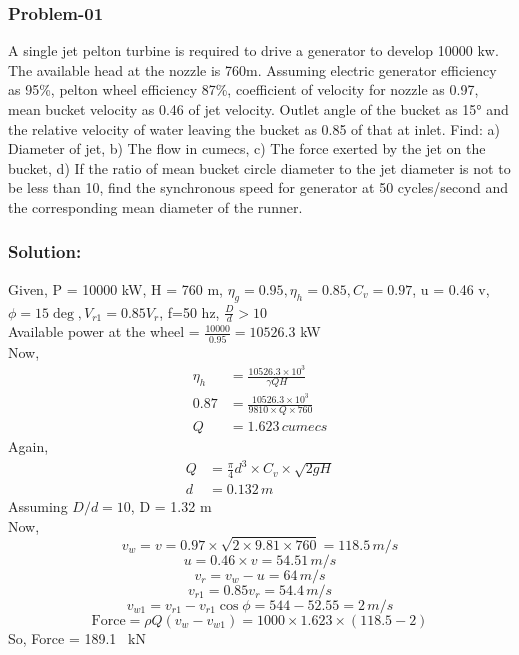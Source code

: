 \documentclass{article}
\begin{document}
\begin{multicols*}{2}
  \subsubsection*{Problem-01}
  A single jet pelton turbine is required to drive a generator to develop 10000 kw. The available head at the nozzle is 760m. Assuming electric generator efficiency as 95\%, pelton wheel efficiency 87\%, coefficient of velocity for nozzle as 0.97, mean bucket velocity as 0.46 of jet velocity. Outlet angle of the bucket as 15° and the relative velocity of water leaving the bucket as 0.85 of that at inlet. Find: a) Diameter of jet, b) The flow in cumecs, c) The force exerted by the jet on the bucket, d) If the ratio of mean bucket circle diameter to the jet diameter is not to be less than 10, find the synchronous speed for generator at 50 cycles/second and the corresponding mean diameter of the runner.

  \subsubsection*{Solution:}
  Given, P = 10000 kW, H = 760 m, $\eta_g = 0.95, \eta_h = 0.85, C_v = 0.97$, u = 0.46 v, $\phi = 15\deg , V_{r1} = 0.85 V_r$, f=50 hz, $\frac{D}{d} > 10 $ \\

  Available power at the wheel = $\frac{10000}{0.95} = 10526.3$ kW \\
  Now, \begin{align*}
    \eta_h &= \frac{10526.3\times 10^3}{\gamma Q H} \\
    0.87 &= \frac{10526.3\times 10^3}{9810 \times Q \times 760} \\
    Q &= 1.623 \, cumecs 
  \end{align*}
  Again,
  \begin{align*}
    Q &= \frac{\pi}{4} d^3 \times C_v \times \sqrt{2gH} \\
    d &= 0.132 \, m 
  \end{align*}
  Assuming $D/d=10$, D = 1.32 m \\
  Now, $$v_w = v = 0.97 \times \sqrt{2\times 9.81\times 760} = 118.5 \, m/s$$
  $$u = 0.46 \times v = 54.51 \, m/s$$ 
  $$v_r = v_w - u = 64 \, m/s$$
  $$v_{r1} = 0.85 v_r = 54.4 \, m/s$$ 
  $$v_{w1} = v_{r1} - v_{r1} \cos \phi = 544 -52.55 = 2 \, m/s $$
  $$\text{Force} = \rho Q (v_w - v_{w1}) = 1000 \times 1.623 \times (118.5-2)$$ So, Force = 189.1 \, kN 


\end{multicols*}
\end{document}
